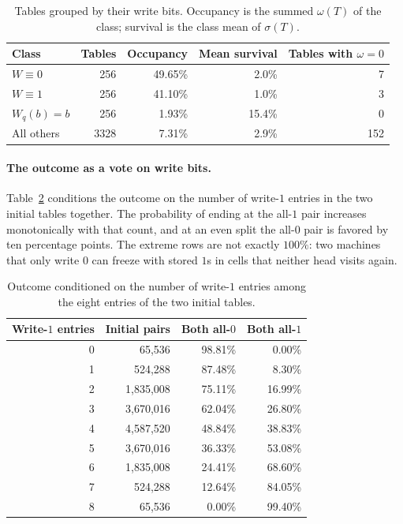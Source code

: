 \documentclass{article}
\begin{document}
\begin{table}[h]
\centering
\caption{Tables grouped by their write bits.  Occupancy is the summed
$\omega(T)$ of the class; survival is the class mean of $\sigma(T)$.}
\label{tab:rewriting-write-classes}
\begin{tabular}{lrrrr}
\toprule
Class & Tables & Occupancy & Mean survival & Tables with $\omega=0$ \\
\midrule
$W\equiv0$ & 256 & 49.65\% & 2.0\% & 7 \\
$W\equiv1$ & 256 & 41.10\% & 1.0\% & 3 \\
$W_q(b)=b$ & 256 & 1.93\% & 15.4\% & 0 \\
All others & 3328 & 7.31\% & 2.9\% & 152 \\
\bottomrule
\end{tabular}
\end{table}

\paragraph{The outcome as a vote on write bits.}
Table~\ref{tab:rewriting-vote} conditions the outcome on the number of
write-$1$ entries in the two initial tables together.  The probability of
ending at the all-$1$ pair increases monotonically with that count, and at
an even split the all-$0$ pair is favored by ten percentage points.  The
extreme rows are not exactly $100\%$: two machines that only write $0$ can
freeze with stored $1$s in cells that neither head visits again.

\begin{table}[h]
\centering
\caption{Outcome conditioned on the number of write-$1$ entries among the
eight entries of the two initial tables.}
\label{tab:rewriting-vote}
\begin{tabular}{rrrr}
\toprule
Write-$1$ entries & Initial pairs & Both all-$0$ & Both all-$1$ \\
\midrule
0 & 65,536 & 98.81\% & 0.00\% \\
1 & 524,288 & 87.48\% & 8.30\% \\
2 & 1,835,008 & 75.11\% & 16.99\% \\
3 & 3,670,016 & 62.04\% & 26.80\% \\
4 & 4,587,520 & 48.84\% & 38.83\% \\
5 & 3,670,016 & 36.33\% & 53.08\% \\
6 & 1,835,008 & 24.41\% & 68.60\% \\
7 & 524,288 & 12.64\% & 84.05\% \\
8 & 65,536 & 0.00\% & 99.40\% \\
\bottomrule
\end{tabular}
\end{table}
\end{document}
